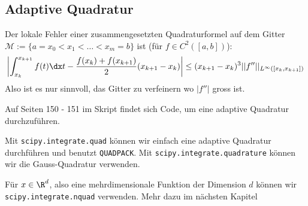 \newsection
\subsection{Adaptive Quadratur}
Der lokale Fehler einer zusammengesetzten Quadraturformel auf dem Gitter $\mathcal{M} := \{ a = x_0 < x_1 < \dots < x_m = b \}$ ist (für $f \in C^2([a, b])$):
\begin{align*}
    \left| \int_{x_k}^{x_{k + 1}} f(t) \dx t - \frac{f(x_k) + f(x_{k + 1})}{2}(x_{k + 1} - x_k) \right| \leq (x_{k + 1} - x_k)^3 ||f''||_{L^\infty([x_k, x_{k + 1}])}
\end{align*}
Also ist es nur sinnvoll, das Gitter zu verfeinern wo $|f''|$ gross ist.

Auf Seiten 150 - 151 im Skript findet sich Code, um eine adaptive Quadratur durchzuführen.

 Mit \texttt{scipy.integrate.quad} können wir einfach eine adaptive Quadratur durchführen und benutzt \texttt{QUADPACK}.
Mit \texttt{scipy.integrate.quadrature} können wir die Gauss-Quadratur verwenden.

Für $x \in \R^d$, also eine mehrdimensionale Funktion der Dimension $d$ können wir \texttt{scipy.integrate.nquad} verwenden. Mehr dazu im nächsten Kapitel

